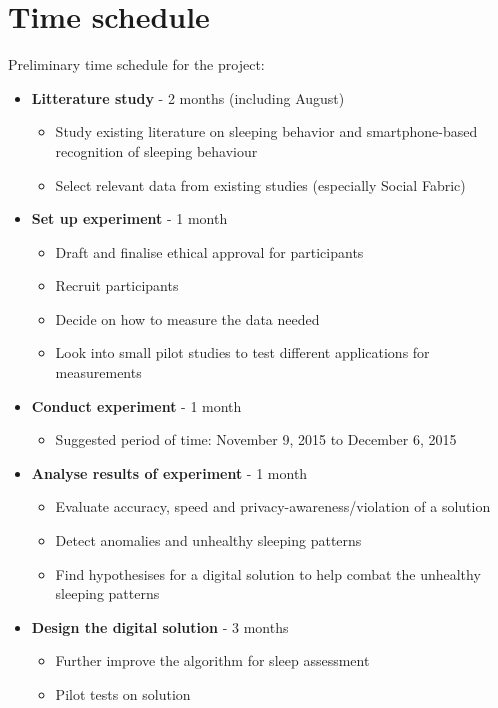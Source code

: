 \documentclass[12pt]{article}
\begin{document}
\section{Time schedule}
Preliminary time schedule for the project:
	\begin{itemize}
		\item \textbf{Litterature study} - 2 months (including August)
			\begin{itemize}
				\item Study existing literature on sleeping behavior and smartphone-based recognition of sleeping behaviour
				\item Select relevant data from existing studies (especially Social Fabric)
			\end{itemize}	
		\item \textbf{Set up experiment} - 1 month
			\begin{itemize}
				\item Draft and finalise ethical approval for participants 
				\item Recruit participants
				\item Decide on how to measure the data needed
				\item Look into small pilot studies to test different applications for measurements
			\end{itemize}	
		\item \textbf{Conduct experiment} - 1 month
			\begin{itemize}
				\item Suggested period of time: November 9, 2015 to December 6, 2015
			\end{itemize}	
		\item \textbf{Analyse results of experiment} - 1 month
			\begin{itemize}
				\item Evaluate accuracy, speed and privacy-awareness/violation of a solution
				\item Detect anomalies and unhealthy sleeping patterns
				\item Find hypothesises for a digital solution to help combat the unhealthy sleeping 
				patterns   
			\end{itemize}	
		\item \textbf{Design the digital solution} - 3 months 
			\begin{itemize}
				\item Further improve the algorithm for sleep assessment 
				\item Pilot tests on solution 

\end{itemize}
\end{itemize}
\end{document}
